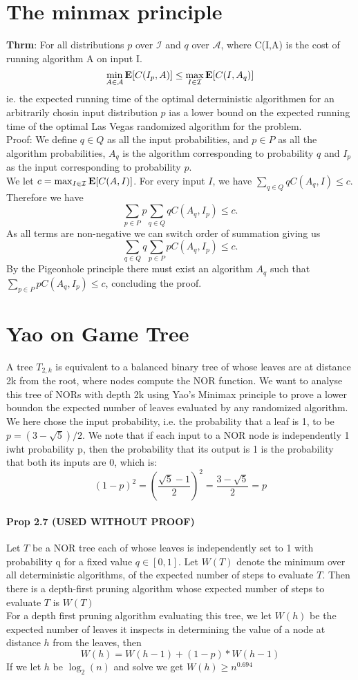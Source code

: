 \documentclass[a4paper]{article}
\def\A{\mathcal{A}}
\def\I{\mathcal{I}}
\def\E{\mathbb{E}}
\def\E{\mbox{\textbf{E}}}
\begin{document}
\section{The minmax principle}
\textbf{Thrm}:
For all distributions $p$ over $\I$ and $q$ over $\A$, where C(I,A) is the cost of running algorithm A on input I.
$$
\min_{A \in \A} \E[C(I_p, A)] \leq \max_{I\in\I} \E[C(I,A_q)]
$$
ie. the expected running time of the optimal deterministic algorithmen for an arbitrarily chosin input distribution $p$ ias a lower bound on the expected running time of the optimal Las Vegas randomized algorithm for the problem.\\
Proof:
We define $q \in Q$ as all the input probabilities, and $p\in P$ as all the algorithm probabilities, $A_q$ is the algorithm corresponding to probability $q$ and $I_p$ as the input corresponding to probability $p$.\\
We let $c = \max_{I\in\I} \E[C(A,I)]$. For every input $I$, we have $\sum_{q \in Q} q C(A_q,I) \leq c$. Therefore we have
$$\sum_{p \in P} p \sum_{q \in Q} q C(A_q,I_p) \leq c.$$
As all terms are non-negative we can switch order of summation giving us
$$\sum_{q \in Q} q \sum_{p \in P} p C(A_q,I_p) \leq c.$$
By the Pigeonhole principle there must exist an algorithm $A_q$ such that $\sum_{p \in P} p C(A_q,I_p) \leq c$, concluding the proof.
\section{Yao on Game Tree}
A tree $T_{2,k}$ is equivalent to a balanced binary tree of whose leaves are at distance 2k from the root, where nodes compute the NOR function.
We want to analyse this tree of NORs with depth 2k using Yao's Minimax principle to prove a lower boundon the expected number of leaves evaluated by any randomized algorithm.
We here chose the input probability, i.e. the probability that a leaf is 1, to be $p = (3 - \sqrt{5})/2$. We note that if each input to a NOR node is independently 1 iwht probability p, then the probability that its output is 1 is the probability that both its inputs are 0, which is:
$$
(1 - p)^2 = \left(\frac{\sqrt 5 - 1}{2} \right)^2 = \frac{3-\sqrt{5}}{2} = p
$$
\paragraph{Prop 2.7 (USED WITHOUT PROOF)} Let $T$ be a NOR tree each of whose leaves is independently set to 1 with probability q for a fixed value $q \in [0,1]$. Let $W(T)$ denote the minimum over all deterministic algorithms, of the expected number of steps to evaluate $T$. Then there is a depth-first pruning algorithm whose expected number of steps to evaluate $T$ is $W(T)$\\
For a depth first pruning algorithm evaluating this tree, we let $W(h)$ be the expected number of leaves it inspects in determining the value of a node at distance $h$ from the leaves, then
$$
W(h) = W(h-1) + (1-p) * W(h-1)
$$
If we let $h$ be $\log_2(n)$ and solve we get $W(h) \geq n^{0.694}$
\end{document}
